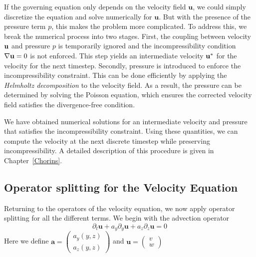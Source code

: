 If the governing equation only depends on the velocity field $\textbf{u}$,
we could simply discretize the equation and solve numerically for 
$\textbf{u}$. But with the presence of the pressure term $p$, this makes
the problem more complicated. To address this, we break the numerical
process into two stages. First, the coupling between velocity $\textbf u$
and pressure $p$ is temporarily ignored and the incompressibility
condition $\nabla \textbf u = 0$ is not enforced. This step yields an
intermediate velocity $\textbf u^*$ for the velocity for the next
timestep. Secondly, pressure is introduced to enforce the
incompressibility constraint. This can be done efficiently by applying the
\textit{Helmholtz decomposition} to the velocity field. As a result, the
pressure can be determined by solving the Poisson equation, which ensures
the corrected velocity field satisfies the divergence-free condition.

We have obtained numerical solutions for an intermediate velocity and
pressure that satisfies the incompressibility constraint. Using these
quantities, we can compute the velocity at the next discrete timestep
while preserving incompressibility. A detailed description of this
procedure is given in Chapter~\ref{Chorins}.

\subsection{Operator splitting for the Velocity Equation}

Returning to the operators of the velocity equation, we now apply
operator splitting for all the different terms.
We begin with the advection operator
$$\partial_t \bm{u} + a_y\partial_y \bm{u} + a_z\partial_z\bm{u} = 0$$
Here we define
$
\bm{a} = 
\begin{pmatrix}
    a_y(y,z) \\
    a_z(y,z)
\end{pmatrix}$
and 
$\bm{u} = \begin{pmatrix}
    v \\
    w
\end{pmatrix}$

